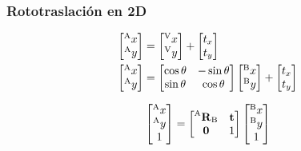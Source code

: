 \begin{frame}
    \frametitle{Rototraslación en 2D}

    \begin{align*}
        \begin{bmatrix}
            \toCoord{x}{A}\\
            \toCoord{y}{A}
        \end{bmatrix} &=
        \begin{bmatrix}
            \toCoord{x}{V}\\
            \toCoord{y}{V}
        \end{bmatrix} +
        \begin{bmatrix}
            t_x\\
            t_y
        \end{bmatrix}\\
        \begin{bmatrix}
            \toCoord{x}{A}\\
            \toCoord{y}{A}
        \end{bmatrix} &=
        \begin{bmatrix}
            \cos \theta &-\sin \theta \\
            \sin \theta &\cos \theta \\
        \end{bmatrix}
        \begin{bmatrix}
            \toCoord{x}{B}\\
            \toCoord{y}{B}
        \end{bmatrix} +
        \begin{bmatrix}
            t_x\\
            t_y\\
        \end{bmatrix}
    \end{align*}

    \begin{equation*}
        \begin{bmatrix}
            \toCoord{x}{A}\\
            \toCoord{y}{A}\\
            1
        \end{bmatrix} =
        \begin{bmatrix}
            \rotationCoord{A}{B} & \translation\\
            \vec{0} & 1
        \end{bmatrix}
        \begin{bmatrix}
            \toCoord{x}{B}\\
            \toCoord{y}{B}\\
            1
        \end{bmatrix}
    \end{equation*}


\end{frame}
